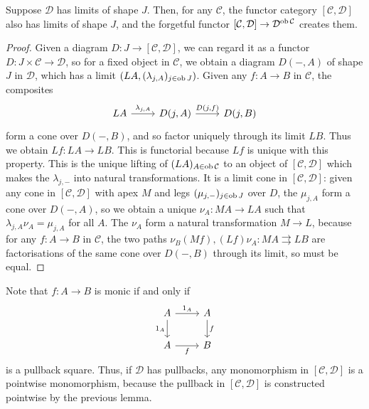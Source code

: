 \begin{lemma}
    Suppose \( \mathcal D \) has limits of shape \( J \).
    Then, for any \( \mathcal C \), the functor category \( [\mathcal C, \mathcal D] \) also has limits of shape \( J \), and the forgetful functor \( [\mathcal C, \mathcal D] \to \mathcal D^{\operatorname{ob} \mathcal C} \) creates them.
\end{lemma}
\begin{proof}
    Given a diagram \( D : J \to [\mathcal C, \mathcal D] \), we can regard it as a functor \( D : J \times \mathcal C \to \mathcal D \), so for a fixed object in \( \mathcal C \), we obtain a diagram \( D(-, A) \) of shape \( J \) in \( \mathcal D \), which has a limit \( (LA, (\lambda_{j,A})_{j \in \operatorname{ob} J}) \).
    Given any \( f : A \to B \) in \( \mathcal C \), the composites
\[\begin{tikzcd}
	LA & {D(j,A)} & {D(j,B)}
	\arrow["{\lambda_{j,A}}", from=1-1, to=1-2]
	\arrow["{D(j,f)}", from=1-2, to=1-3]
\end{tikzcd}\]
    form a cone over \( D(-, B) \), and so factor uniquely through its limit \( LB \).
    Thus we obtain \( Lf : LA \to LB \).
    This is functorial because \( Lf \) is unique with this property.
    This is the unique lifting of \( (LA)_{A \in \operatorname{ob} \mathcal C} \) to an object of \( [\mathcal C, \mathcal D] \) which makes the \( \lambda_{j,-} \) into natural transformations.
    It is a limit cone in \( [\mathcal C, \mathcal D] \): given any cone in \( [\mathcal C, \mathcal D] \) with apex \( M \) and legs \( (\mu_{j,-})_{j \in \operatorname{ob} J} \) over \( D \), the \( \mu_{j,A} \) form a cone over \( D(-, A) \), so we obtain a unique \( \nu_A : MA \to LA \) such that \( \lambda_{j,A} \nu_A = \mu_{j,A} \) for all \( A \).
    The \( \nu_A \) form a natural transformation \( M \to L \), because for any \( f : A \to B \) in \( \mathcal C \), the two paths \( \nu_B(Mf), (Lf)\nu_A : MA \rightrightarrows LB \) are factorisations of the same cone over \( D(-, B) \) through its limit, so must be equal.
\end{proof}
\begin{remark}
    Note that \( f : A \to B \) is monic if and only if
\[\begin{tikzcd}
	A & A \\
	A & B
	\arrow["{1_A}", from=1-1, to=1-2]
	\arrow["f", from=1-2, to=2-2]
	\arrow["{1_A}"', from=1-1, to=2-1]
	\arrow["f"', from=2-1, to=2-2]
\end{tikzcd}\]
    is a pullback square.
    Thus, if \( \mathcal D \) has pullbacks, any monomorphism in \( [\mathcal C, \mathcal D] \) is a pointwise monomorphism, because the pullback in \( [\mathcal C, \mathcal D] \) is constructed pointwise by the previous lemma.
\end{remark}

